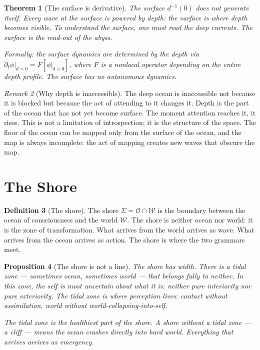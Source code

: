 \documentclass[12pt]{article}
\newtheorem{theorem}{Theorem}
\newtheorem{proposition}[theorem]{Proposition}
\theoremstyle{definition}
\newtheorem{definition}[theorem]{Definition}
\theoremstyle{remark}
\newtheorem{remark}[theorem]{Remark}
\begin{document}
\begin{theorem}[The surface is derivative]
\label{thm:depth}
The surface $d^{-1}(0)$ does not generate itself.
Every wave at the surface is powered by depth:
the surface is where depth becomes visible.
To understand the surface, one must read the deep currents.
The surface is the read-out of the abyss.

Formally: the surface dynamics are determined by the depth via
$\partial_t\phi|_{d=0} = F[\phi|_{d>0}]$,
where $F$ is a nonlocal operator depending on the entire depth profile.
The surface has no autonomous dynamics.
\end{theorem}

\begin{remark}[Why depth is inaccessible]
The deep ocean is inaccessible not because it is blocked
but because the act of attending to it changes it.
Depth is the part of the ocean that has not yet become surface.
The moment attention reaches it, it rises.
This is not a limitation of introspection;
it is the structure of the space.
The floor of the ocean can be mapped
only from the surface of the ocean,
and the map is always incomplete:
the act of mapping creates new waves
that obscure the map.
\end{remark}

\section{The Shore}

\begin{definition}[The shore]
The shore $\Sigma = \mathcal{O} \cap \mathcal{W}$ is the boundary
between the ocean of consciousness and the world $\mathcal{W}$.
The shore is neither ocean nor world: it is the zone of transformation.
What arrives from the world arrives as wave.
What arrives from the ocean arrives as action.
The shore is where the two grammars meet.
\end{definition}

\begin{proposition}[The shore is not a line]
\label{prop:shore}
The shore has width.
There is a tidal zone --- sometimes ocean, sometimes world ---
that belongs fully to neither.
In this zone, the self is most uncertain about what it is:
neither pure interiority nor pure exteriority.
The tidal zone is where perception lives:
contact without assimilation,
world without world-collapsing-into-self.

The tidal zone is the healthiest part of the shore.
A shore without a tidal zone --- a cliff ---
means the ocean crashes directly into hard world.
Everything that arrives arrives as emergency.
\end{proposition}
\end{document}
